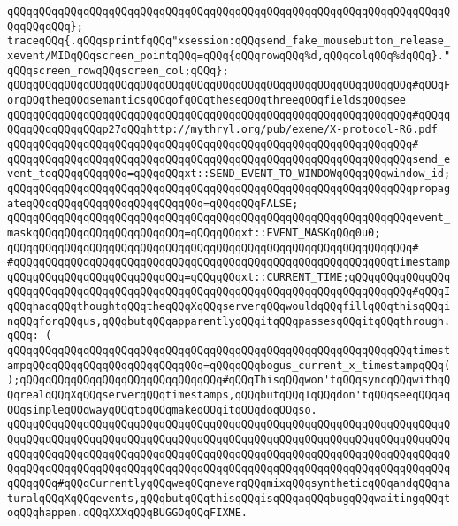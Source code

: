 \verb|qQQqqQQqqQQqqQQqqQQqqQQqqQQqqQQqqQQqqQQqqQQqqQQqqQQqqQQqqQQqqQQqqQQqqQQqqQQqqQQq};|\newline
\newline
\verb|traceqQQq{.qQQqsprintfqQQq"xsession:qQQqsend_fake_mousebutton_release_xevent/MIDqQQqscreen_pointqQQq=qQQq{qQQqrowqQQq%d,qQQqcolqQQq%dqQQq}."qQQqscreen_rowqQQqscreen_col;qQQq};|\newline
\verb|qQQqqQQqqQQqqQQqqQQqqQQqqQQqqQQqqQQqqQQqqQQqqQQqqQQqqQQqqQQqqQQq#qQQqForqQQqtheqQQqsemanticsqQQqofqQQqtheseqQQqthreeqQQqfieldsqQQqsee|\newline
\verb|qQQqqQQqqQQqqQQqqQQqqQQqqQQqqQQqqQQqqQQqqQQqqQQqqQQqqQQqqQQqqQQq#qQQqqQQqqQQqqQQqqQQqp27qQQqhttp://mythryl.org/pub/exene/X-protocol-R6.pdf|\newline
\verb|qQQqqQQqqQQqqQQqqQQqqQQqqQQqqQQqqQQqqQQqqQQqqQQqqQQqqQQqqQQqqQQq#|\newline
\verb|qQQqqQQqqQQqqQQqqQQqqQQqqQQqqQQqqQQqqQQqqQQqqQQqqQQqqQQqqQQqqQQqsend_event_toqQQqqQQqqQQq=qQQqqQQqxt::SEND_EVENT_TO_WINDOWqQQqqQQqwindow_id;|\newline
\verb|qQQqqQQqqQQqqQQqqQQqqQQqqQQqqQQqqQQqqQQqqQQqqQQqqQQqqQQqqQQqqQQqpropagateqQQqqQQqqQQqqQQqqQQqqQQqqQQq=qQQqqQQqFALSE;|\newline
\verb|qQQqqQQqqQQqqQQqqQQqqQQqqQQqqQQqqQQqqQQqqQQqqQQqqQQqqQQqqQQqqQQqevent_maskqQQqqQQqqQQqqQQqqQQqqQQq=qQQqqQQqxt::EVENT_MASKqQQq0u0;|\newline
\verb|qQQqqQQqqQQqqQQqqQQqqQQqqQQqqQQqqQQqqQQqqQQqqQQqqQQqqQQqqQQqqQQq#|\newline
\verb|#qQQqqQQqqQQqqQQqqQQqqQQqqQQqqQQqqQQqqQQqqQQqqQQqqQQqqQQqqQQqtimestampqQQqqQQqqQQqqQQqqQQqqQQqqQQq=qQQqqQQqxt::CURRENT_TIME;qQQqqQQqqQQqqQQqqQQqqQQqqQQqqQQqqQQqqQQqqQQqqQQqqQQqqQQqqQQqqQQqqQQqqQQqqQQqqQQq#qQQqIqQQqhadqQQqthoughtqQQqtheqQQqXqQQqserverqQQqwouldqQQqfillqQQqthisqQQqinqQQqforqQQqus,qQQqbutqQQqapparentlyqQQqitqQQqpassesqQQqitqQQqthrough.qQQq:-(|\newline
\verb|qQQqqQQqqQQqqQQqqQQqqQQqqQQqqQQqqQQqqQQqqQQqqQQqqQQqqQQqqQQqqQQqtimestampqQQqqQQqqQQqqQQqqQQqqQQqqQQq=qQQqqQQqbogus_current_x_timestampqQQq();qQQqqQQqqQQqqQQqqQQqqQQqqQQqqQQq#qQQqThisqQQqwon'tqQQqsyncqQQqwithqQQqrealqQQqXqQQqserverqQQqtimestamps,qQQqbutqQQqIqQQqdon'tqQQqseeqQQqaqQQqsimpleqQQqwayqQQqtoqQQqmakeqQQqitqQQqdoqQQqso.|\newline
\verb|qQQqqQQqqQQqqQQqqQQqqQQqqQQqqQQqqQQqqQQqqQQqqQQqqQQqqQQqqQQqqQQqqQQqqQQqqQQqqQQqqQQqqQQqqQQqqQQqqQQqqQQqqQQqqQQqqQQqqQQqqQQqqQQqqQQqqQQqqQQqqQQqqQQqqQQqqQQqqQQqqQQqqQQqqQQqqQQqqQQqqQQqqQQqqQQqqQQqqQQqqQQqqQQqqQQqqQQqqQQqqQQqqQQqqQQqqQQqqQQqqQQqqQQqqQQqqQQqqQQqqQQqqQQqqQQqqQQqqQQqqQQqqQQq#qQQqCurrentlyqQQqweqQQqneverqQQqmixqQQqsyntheticqQQqandqQQqnaturalqQQqXqQQqevents,qQQqbutqQQqthisqQQqisqQQqaqQQqbugqQQqwaitingqQQqtoqQQqhappen.qQQqXXXqQQqBUGGOqQQqFIXME.|\newline
